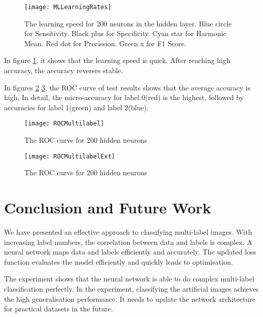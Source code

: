 \begin{figure}[htb]
\centering
\texttt{[image: MLLearningRates]}
\caption{\label{fig:MLLearningRates}The learning speed for 200 neurons in the hidden layer. Blue circle for Sensitivity. Black plus for Specificity. Cyan star for Harmonic Mean. Red dot for Precission. Green x for F1 Score.}
\end{figure}
In figure \ref{fig:MLLearningRates}, it shows that the learning speed is quick. After reaching high accuracy, the accuracy reverses stable. 

In figures \ref{fig:MLROCCurve} \ref{fig:MLROCCurveExt}, the ROC curve of test results shows that the average accuracy is high. In detail, the micro-accuracy for label $0$(red) is the highest, followed by accuracies for label $1$(green) and label $2$(blue). 
\begin{figure}[htb]
\centering
\texttt{[image: ROCMultilabel]}
\caption{\label{fig:MLROCCurve}The ROC curve for 200 hidden neurons}
\end{figure}

\begin{figure}[htb]
\centering
\texttt{[image: ROCMultilabelExt]}
\caption{\label{fig:MLROCCurveExt}The ROC curve for 200 hidden neurons}
\end{figure}

\section{Conclusion and Future Work}

We have presented an effective approach to classifying multi-label images. With increasing label numbers, the correlation between data and labels is complex. A neural network maps data and labels efficiently and accurately. The updated loss function evaluates the model efficiently and quickly leads to optimisation.

The experiment shows that the neural network is able to do complex multi-label classification perfectly. In the experiment, classifying the artificial images achieves the high generalisation performance. It needs to update the network architecture for practical datasets in the future.












